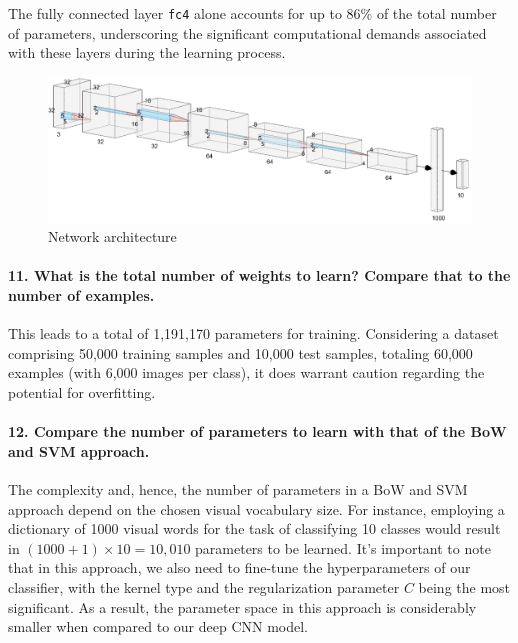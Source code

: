 The fully connected layer \texttt{fc4} alone accounts for up to 86\% of the total number of parameters, underscoring the significant computational demands associated with these layers during the learning process.

\begin{figure}[H]
    \centering
    \includegraphics*[width=\textwidth]{figs/AlexNet_style_log.png}
    \caption{Network architecture}
    \label{fig:AlexNetstylelog}
\end{figure}

\paragraph{11. What is the total number of weights to learn? Compare that to the number of examples.}
This leads to a total of 1,191,170 parameters for training. Considering a dataset comprising 50,000 training samples and 10,000 test samples, totaling 60,000 examples (with 6,000 images per class), it does warrant caution regarding the potential for overfitting.

\paragraph{12. Compare the number of parameters to learn with that of the BoW and SVM approach.}
The complexity and, hence, the number of parameters in a BoW and SVM approach depend on the chosen visual vocabulary size. For instance, employing a dictionary of 1000 visual words for the task of classifying 10 classes would result in \( (1000 + 1) \times 10 = 10,010 \) parameters to be learned. It's important to note that in this approach, we also need to fine-tune the hyperparameters of our classifier, with the kernel type and the regularization parameter \( C \) being the most significant. As a result, the parameter space in this approach is considerably smaller when compared to our deep CNN model.

